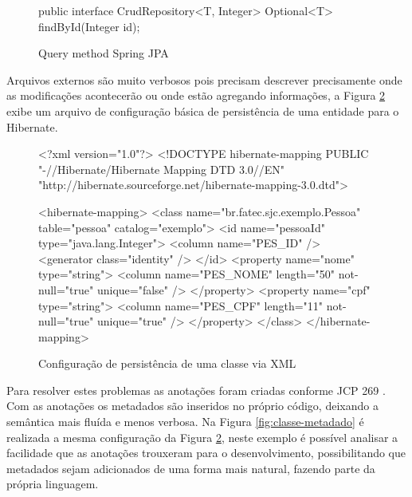 \begin{figure}[H]
    \centering
    \caption{Query method Spring JPA}
    \begin{java}
public interface CrudRepository<T, Integer> {
    Optional<T> findById(Integer id);
}
    \end{java}
    \label{fig:spring-qyery-method}
\end{figure}

Arquivos externos são muito verbosos pois precisam descrever precisamente onde as modificações acontecerão ou onde estão agregando informações, a Figura \ref{fig:arquivo-metadado} exibe um arquivo de configuração básica de persistência de uma entidade para o Hibernate.

\begin{figure}[H]
    \centering
    \caption{Configuração de persistência de uma classe via XML}
    \begin{xml}
<?xml version="1.0"?>
<!DOCTYPE hibernate-mapping PUBLIC "-//Hibernate/Hibernate Mapping DTD 3.0//EN"
"http://hibernate.sourceforge.net/hibernate-mapping-3.0.dtd">

<hibernate-mapping>
    <class name="br.fatec.sjc.exemplo.Pessoa" table="pessoa" catalog="exemplo">
        <id name="pessoaId" type="java.lang.Integer">
            <column name="PES_ID" />
            <generator class="identity" />
        </id>
        <property name="nome" type="string">
            <column name="PES_NOME" length="50" not-null="true" unique="false" />
        </property>
        <property name="cpf" type="string">
            <column name="PES_CPF" length="11" not-null="true" unique="true" />
        </property>
    </class>
</hibernate-mapping>
    \end{xml}
    \label{fig:arquivo-metadado}
\end{figure}

\par Para resolver estes problemas as anotações foram criadas conforme JCP 269 . Com as anotações os metadados são inseridos no próprio código, deixando a semântica mais fluída e menos verbosa. Na Figura \ref{fig:classe-metadado} é realizada a mesma configuração da Figura \ref{fig:arquivo-metadado}, neste exemplo é possível analisar a facilidade que as anotações trouxeram para o desenvolvimento, possibilitando que metadados sejam adicionados de uma forma mais natural, fazendo parte da própria linguagem.

